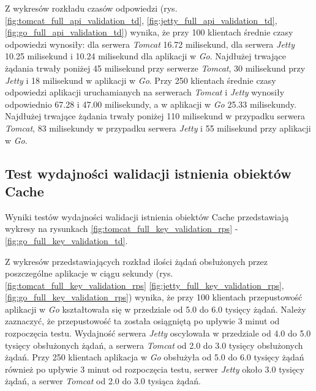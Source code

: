 Z wykresów rozkładu czasów odpowiedzi (rys. \ref{fig:tomcat_full_api_validation_td}, \ref{fig:jetty_full_api_validation_td}, \ref{fig:go_full_api_validation_td}) wynika, że przy 100 klientach średnie czasy odpowiedzi wynosiły: dla serwera \textsl{Tomcat} 16.72 milisekund, dla serwera \textsl{Jetty} 10.25 milisekund i 10.24 milisekund dla aplikacji w \textsl{Go}. Najdłużej trwające żądania trwały poniżej 45 milisekund przy serwerze \textsl{Tomcat}, 30 milisekund przy \textsl{Jetty} i 18 milisekund w aplikacji w \textsl{Go}. Przy 250 klientach średnie czasy odpowiedzi aplikacji uruchamianych na serwerach \textsl{Tomcat} i \textsl{Jetty} wynosiły odpowiednio 67.28 i 47.00 milisekundy, a w aplikacji w \textsl{Go} 25.33 milisekundy. Najdłużej trwające żądania trwały poniżej 110 milisekund w przypadku serwera \textsl{Tomcat}, 83 milisekundy w przypadku serwera \textsl{Jetty} i 55 milisekund przy aplikacji w \textsl{Go}.

% 
\clearpage

\subsection{Test wydajności walidacji istnienia obiektów Cache}
Wyniki testów wydajności walidacji istnienia obiektów Cache przedstawiają wykresy na rysunkach \ref{fig:tomcat_full_key_validation_rps} - \ref{fig:go_full_key_validation_td}.              

Z wykresów przedstawiających rozkład ilości żądań obsłużonych przez poszczególne aplikacje w ciągu sekundy  (rys. \ref{fig:tomcat_full_key_validation_rps} \ref{fig:jetty_full_key_validation_rps}, \ref{fig:go_full_key_validation_rps}) wynika, że przy 100 klientach przepustowość aplikacji w \textsl{Go} kształtowała się w przedziale od 5.0 do 6.0 tysięcy żądań. Należy zaznaczyć, że przepustowość ta została osiągniętą po upływie 3 minut od rozpoczęcia testu. Wydajność serwera \textsl{Jetty} oscylowała w przedziale od 4.0 do 5.0 tysięcy obsłużonych żądań, a serwera \textsl{Tomcat} od 2.0 do 3.0 tysięcy obsłużonych żądań. Przy 250 klientach aplikacja w \textsl{Go} obsłużyła od 5.0 do 6.0 tysięcy żądań również po upływie 3 minut od rozpoczęcia testu, serwer \textsl{Jetty} około 3.0 tysięcy żądań, a serwer \textsl{Tomcat} od 2.0 do 3.0 tysiąca żądań.

